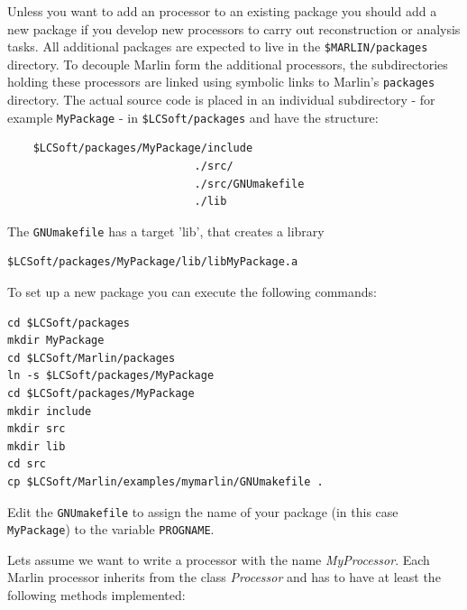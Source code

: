 Unless you want to add an processor to an existing package you should add a 
new package if you develop new processors to carry out reconstruction or
analysis tasks. All additional packages are expected to live in the 
{\tt \$MARLIN/packages} directory.
To decouple Marlin form the additional processors, the subdirectories holding 
these processors are linked using symbolic links to Marlin's {\tt packages} 
directory. The actual source code is placed in an individual 
subdirectory - for example {\tt MyPackage} - in {\tt \$LCSoft/packages}
and have the structure:

\begin{verbatim}
    $LCSoft/packages/MyPackage/include
                             ./src/
                             ./src/GNUmakefile
                             ./lib
\end{verbatim}

The {\tt GNUmakefile} has a target 'lib', that creates a library

\begin{verbatim}
$LCSoft/packages/MyPackage/lib/libMyPackage.a
\end{verbatim}

To set up a new package you can execute the following commands: 

\begin{verbatim}
cd $LCSoft/packages
mkdir MyPackage
cd $LCSoft/Marlin/packages
ln -s $LCSoft/packages/MyPackage
cd $LCSoft/packages/MyPackage
mkdir include
mkdir src
mkdir lib
cd src
cp $LCSoft/Marlin/examples/mymarlin/GNUmakefile .
\end{verbatim}

Edit the {\tt GNUmakefile} to assign the name of your package 
(in this case {\tt MyPackage}) to the variable {\tt PROGNAME}.

Lets assume we want to write a processor with the name 
{\em MyProcessor}.
Each Marlin processor inherits from the class {\em Processor} and has to have
at least the following methods implemented:


